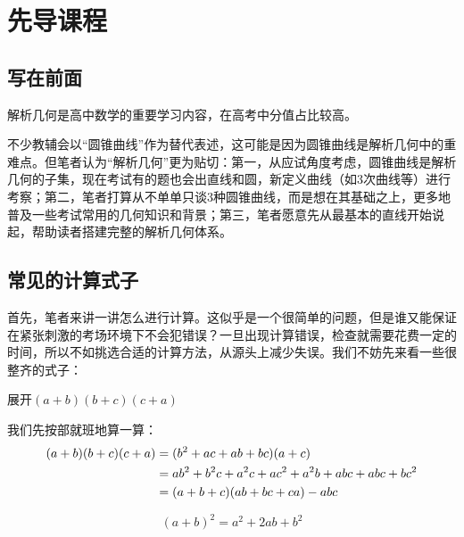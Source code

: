 \chapter{先导课程}
\section{写在前面}
解析几何是高中数学的重要学习内容，在高考中分值占比较高。

不少教辅会以“圆锥曲线”作为替代表述，这可能是因为圆锥曲线是解析几何中的重难点。但笔者认为“解析几何”更为贴切：第一，从应试角度考虑，圆锥曲线是解析几何的子集，现在考试有的题也会出直线和圆，新定义曲线（如3次曲线等）进行考察；第二，笔者打算从不单单只谈3种圆锥曲线，而是想在其基础之上，更多地普及一些考试常用的几何知识和背景；第三，笔者愿意先从最基本的直线开始说起，帮助读者搭建完整的解析几何体系。

\section{常见的计算式子}
首先，笔者来讲一讲怎么进行计算。这似乎是一个很简单的问题，但是谁又能保证在紧张刺激的考场环境下不会犯错误？一旦出现计算错误，检查就需要花费一定的时间，所以不如挑选合适的计算方法，从源头上减少失误。我们不妨先来看一些很整齐的式子：
\begin{example}{}{}
    展开$(a+b)(b+c)(c+a)$
\end{example}
\begin{solution}
    我们先按部就班地算一算：\vspace{-10pt}
    \begin{align*}
    \vspace{-15pt}
    (a+b)(b+c)(c+a)&=(b^2+ac+ab+bc)(a+c)\\
    &=ab^2+b^2c+a^2c+ac^2+a^2b+abc+abc+bc^2\\
    &=(a+b+c)(ab+bc+ca)-abc
    \vspace{-10pt}
    \end{align*}
\end{solution}
\begin{theorem}{}{}
    $$(a+b)^2=a^2+2ab+b^2$$
\end{theorem}
